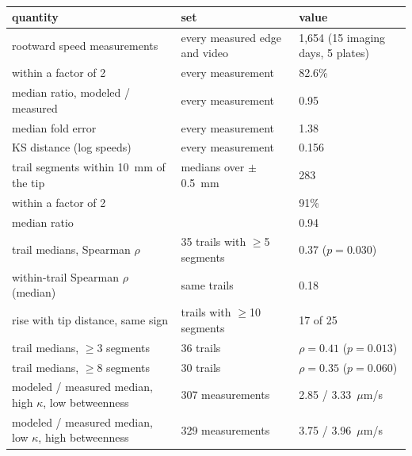 \begin{table}[htbp]
\centering
{\small
\begin{tabular}{lll}
\hline
\textbf{quantity} & \textbf{set} & \textbf{value} \\
\hline
rootward speed measurements & every measured edge and video & 1,654 (15 imaging days, 5 plates) \\
within a factor of 2 & every measurement & 82.6\% \\
median ratio, modeled / measured & every measurement & 0.95 \\
median fold error & every measurement & 1.38 \\
KS distance (log speeds) & every measurement & 0.156 \\
trail segments within 10~mm of the tip & medians over $\pm$0.5~mm & 283 \\
\quad within a factor of 2 & & 91\% \\
\quad median ratio & & 0.94 \\
trail medians, Spearman $\rho$ & 35 trails with $\geq$5 segments & 0.37 ($p = 0.030$) \\
within-trail Spearman $\rho$ (median) & same trails & 0.18 \\
rise with tip distance, same sign & trails with $\geq$10 segments & 17 of 25 \\
trail medians, $\geq$3 segments & 36 trails & $\rho = 0.41$ ($p = 0.013$) \\
trail medians, $\geq$8 segments & 30 trails & $\rho = 0.35$ ($p = 0.060$) \\
modeled / measured median, high $\kappa$, low betweenness & 307 measurements & 2.85 / 3.33~$\mu$m/s \\
modeled / measured median, low $\kappa$, high betweenness & 329 measurements & 3.75 / 3.96~$\mu$m/s \\
\hline
\end{tabular}
}
\caption{}\label{tab:si_model_accuracy}
\end{table}


